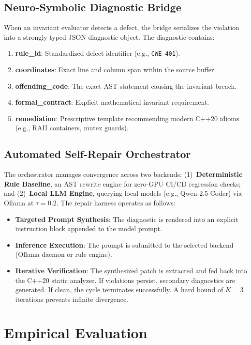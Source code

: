 \documentclass[sigconf,screen,nonacm,pbalance]{acmart}
\begin{document}
\subsection{Neuro-Symbolic Diagnostic Bridge}
When an invariant evaluator detects a defect, the bridge serializes the violation into a strongly typed JSON diagnostic object. The diagnostic contains:
\begin{enumerate}
    \item \textbf{rule\_id}: Standardized defect identifier (e.g., \texttt{CWE-401}).
    \item \textbf{coordinates}: Exact line and column span within the source buffer.
    \item \textbf{offending\_code}: The exact AST statement causing the invariant breach.
    \item \textbf{formal\_contract}: Explicit mathematical invariant requirement.
    \item \textbf{remediation}: Prescriptive template recommending modern C++20 idioms (e.g., RAII containers, mutex guards).
\end{enumerate}

\subsection{Automated Self-Repair Orchestrator}
The orchestrator manages convergence across two backends: (1)~\textbf{Deterministic Rule Baseline}, an AST rewrite engine for zero-GPU CI/CD regression checks; and (2)~\textbf{Local LLM Engine}, querying local models (e.g., Qwen-2.5-Coder) via Ollama at $\tau = 0.2$. The repair harness operates as follows:
\begin{itemize}
    \item \textbf{Targeted Prompt Synthesis}: The diagnostic is rendered into an explicit instruction block appended to the model prompt.
    \item \textbf{Inference Execution}: The prompt is submitted to the selected backend (Ollama daemon or rule engine).
    \item \textbf{Iterative Verification}: The synthesized patch is extracted and fed back into the C++20 static analyzer. If violations persist, secondary diagnostics are generated. If clean, the cycle terminates successfully. A hard bound of $K=3$ iterations prevents infinite divergence.
\end{itemize}

\section{Empirical Evaluation}
\label{sec:evaluation}
\end{document}
